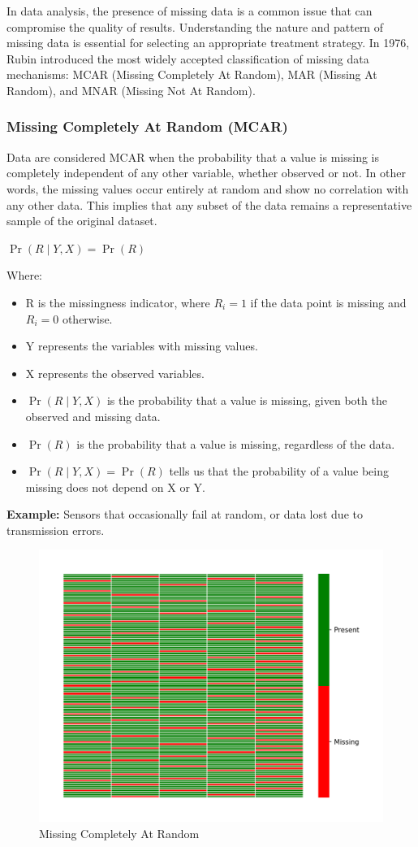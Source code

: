 \documentclass[a4paper,12pt]{article}
\begin{document}
In data analysis, the presence of missing data is a common issue that can compromise the quality of results. Understanding the nature and pattern of missing data is essential for selecting an appropriate treatment strategy. In 1976, Rubin introduced the most widely accepted classification of missing data mechanisms: MCAR (Missing Completely At Random), MAR (Missing At Random), and MNAR (Missing Not At Random). ~\cite{4}

\subsubsection{Missing Completely At Random (MCAR)}

Data are considered MCAR when the probability that a value is missing is completely independent of any other variable, whether observed or not. In other words, the missing values occur entirely at random and show no correlation with any other data. This implies that any subset of the data remains a representative sample of the original dataset. ~\cite{24}


\begin{center}
$\Pr(R \mid Y, X) = \Pr(R)$
\end{center}

Where:
\begin{itemize}
\item R is the missingness indicator, where  \( R_i = 1 \) if the data point is missing and  \( R_i = 0\) otherwise.
\item Y represents the variables with missing values.
\item X represents the observed variables.
\item $\Pr(R \mid Y, X)$ is the probability that a value is missing, given both the observed and missing data.
\item $\Pr(R)$ is the probability that a value is missing, regardless of the data.
\item $\Pr(R \mid Y, X) = \Pr(R)$ tells us that the probability of a value being missing does not depend on X or Y. 
\end{itemize}

\textbf{Example:} Sensors that occasionally fail at random, or data lost due to transmission errors.

\begin{figure}[H]
    \centering
    \includegraphics[width=0.5\linewidth]{MCAR_heatmap.png}
    \caption{Missing Completely At Random}
\end{figure}
\end{document}
